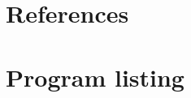\documentclass[pdftex,12pt,a4paper]{report}
\begin{document}


\listoftodos
\tableofcontents
\listoffigures
\listoftables













\appendix
\chapter{References}








\chapter{Program listing}
\end{document}
